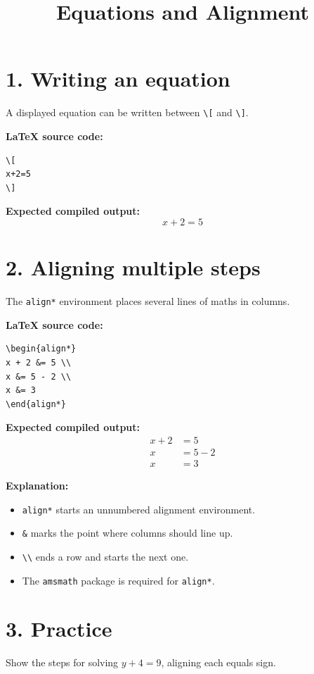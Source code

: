 \documentclass{article}
\title{Equations and Alignment}
\author{ }
\date{}
\begin{document}
\maketitle

\section*{1. Writing an equation}
A displayed equation can be written between \verb|\[| and \verb|\]|.

\textbf{LaTeX source code:}
\begin{verbatim}
\[
x+2=5
\]
\end{verbatim}
\textbf{Expected compiled output:}
\[
x+2=5
\]

\section*{2. Aligning multiple steps}
The \verb|align*| environment places several lines of maths in columns.

\textbf{LaTeX source code:}
\begin{verbatim}
\begin{align*}
x + 2 &= 5 \\
x &= 5 - 2 \\
x &= 3
\end{align*}
\end{verbatim}
\textbf{Expected compiled output:}
\[
\begin{aligned}
x + 2 &= 5 \\
x &= 5 - 2 \\
x &= 3
\end{aligned}
\]

\textbf{Explanation:}
\begin{itemize}
\item \verb|align*| starts an unnumbered alignment environment.
\item \verb|&| marks the point where columns should line up.
\item \verb|\\| ends a row and starts the next one.
\item The \verb|amsmath| package is required for \verb|align*|.
\end{itemize}

\section*{3. Practice}
Show the steps for solving \(y+4=9\), aligning each equals sign.
\end{document}
